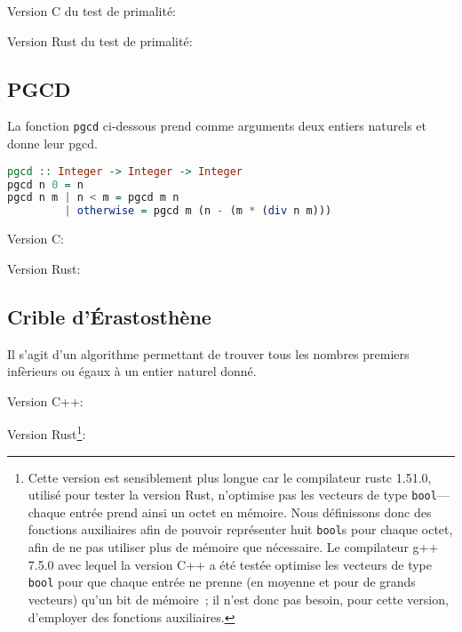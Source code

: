 \medskip

\noindent Version C du test de primalité: 


\medskip

\noindent Version Rust du test de primalité: 


\subsection{PGCD}
\label{app:Haskell_pgcd}

\noindent 
La fonction \texttt{pgcd} ci-dessous prend comme arguments deux entiers naturels et donne leur pgcd.
\begin{lstlisting}[language=Haskell]
pgcd :: Integer -> Integer -> Integer
pgcd n 0 = n
pgcd n m | n < m = pgcd m n
         | otherwise = pgcd m (n - (m * (div n m)))
\end{lstlisting}

\medskip

\noindent Version C: 


\medskip

\noindent Version Rust: 


\subsection{Crible d'Érastosthène}
\label{app:code_erastosthene}

Il s'agit d'un algorithme permettant de trouver tous les nombres premiers infèrieurs ou égaux à un entier naturel donné.

\bigskip

\noindent Version C++: 


\bigskip

\noindent Version Rust\footnote{
    Cette version est sensiblement plus longue car le compilateur rustc 1.51.0, utilisé pour tester la version Rust, n'optimise pas les vecteurs de type \texttt{bool}—chaque entrée prend ainsi un octet en mémoire. 
    Nous définissons donc des fonctions auxiliaires afin de pouvoir représenter huit \texttt{bool}s pour chaque octet, afin de ne pas utiliser plus de mémoire que nécessaire.
    Le compilateur g++ 7.5.0 avec lequel la version C++ a été testée optimise les vecteurs de type \texttt{bool} pour que chaque entrée ne prenne (en moyenne et pour de grands vecteurs) qu'un bit de mémoire ; il n'est donc pas besoin, pour cette version, d'employer des fonctions auxiliaires. 
}: 

